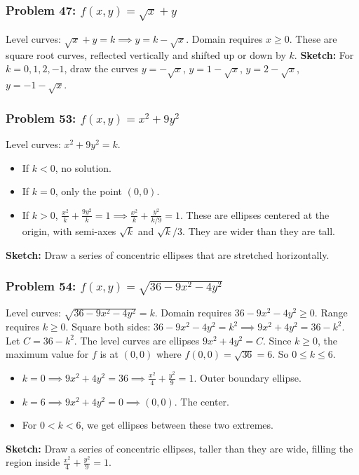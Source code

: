 \documentclass{article}
\begin{document}
\subsubsection{Problem 47: $f(x, y) = \sqrt{x} + y$}
Level curves: $\sqrt{x} + y = k \implies y = k - \sqrt{x}$.
Domain requires $x \ge 0$. These are square root curves, reflected vertically and shifted up or down by $k$.
\textbf{Sketch:} For $k=0, 1, 2, -1$, draw the curves $y=-\sqrt{x}$, $y=1-\sqrt{x}$, $y=2-\sqrt{x}$, $y=-1-\sqrt{x}$.

\subsubsection{Problem 53: $f(x, y) = x^2 + 9y^2$}
Level curves: $x^2 + 9y^2 = k$.
\begin{itemize}
    \item If $k<0$, no solution.
    \item If $k=0$, only the point $(0,0)$.
    \item If $k>0$, $\frac{x^2}{k} + \frac{9y^2}{k} = 1 \implies \frac{x^2}{k} + \frac{y^2}{k/9} = 1$. These are ellipses centered at the origin, with semi-axes $\sqrt{k}$ and $\sqrt{k}/3$. They are wider than they are tall.
\end{itemize}
\textbf{Sketch:} Draw a series of concentric ellipses that are stretched horizontally.

\subsubsection{Problem 54: $f(x, y) = \sqrt{36 - 9x^2 - 4y^2}$}
Level curves: $\sqrt{36 - 9x^2 - 4y^2} = k$.
Domain requires $36 - 9x^2 - 4y^2 \ge 0$. Range requires $k \ge 0$.
Square both sides: $36 - 9x^2 - 4y^2 = k^2 \implies 9x^2 + 4y^2 = 36 - k^2$.
Let $C = 36 - k^2$. The level curves are ellipses $9x^2 + 4y^2 = C$. Since $k \ge 0$, the maximum value for $f$ is at $(0,0)$ where $f(0,0)=\sqrt{36}=6$. So $0 \le k \le 6$.
\begin{itemize}
    \item $k=0 \implies 9x^2+4y^2=36 \implies \frac{x^2}{4} + \frac{y^2}{9}=1$. Outer boundary ellipse.
    \item $k=6 \implies 9x^2+4y^2=0 \implies (0,0)$. The center.
    \item For $0<k<6$, we get ellipses between these two extremes.
\end{itemize}
\textbf{Sketch:} Draw a series of concentric ellipses, taller than they are wide, filling the region inside $\frac{x^2}{4} + \frac{y^2}{9}=1$.
\end{document}
